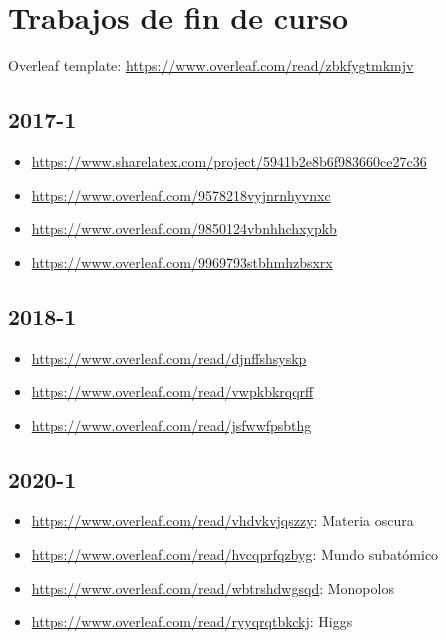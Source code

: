 
\chapter{Trabajos de fin de curso}
Overleaf template: \url{https://www.overleaf.com/read/zbkfygtmkmjv}

\section{2017-1}

\begin{itemize}
\item \url{https://www.sharelatex.com/project/5941b2e8b6f983660ce27c36}
\item \url{https://www.overleaf.com/9578218vyjnrnhyvnxc}
\item \url{https://www.overleaf.com/9850124vbnhhchxypkb}
\item \url{https://www.overleaf.com/9969793stbhmhzbsxrx}
\end{itemize}

\section{2018-1}

\begin{itemize}
\item \url{https://www.overleaf.com/read/djnffshsyskp}
\item \url{https://www.overleaf.com/read/vwpkbkrqqrff}
\item \url{https://www.overleaf.com/read/jsfwwfpsbthg}
\end{itemize}

\section{2020-1}
\begin{itemize}
\item \url{https://www.overleaf.com/read/vhdvkvjqszzy}: Materia oscura
\item \url{https://www.overleaf.com/read/hvcqprfqzbyg}: Mundo subatómico
\item \url{https://www.overleaf.com/read/wbtrshdwgsqd}: Monopolos
\item \url{https://www.overleaf.com/read/ryyqrqtbkckj}: Higgs
\end{itemize}

